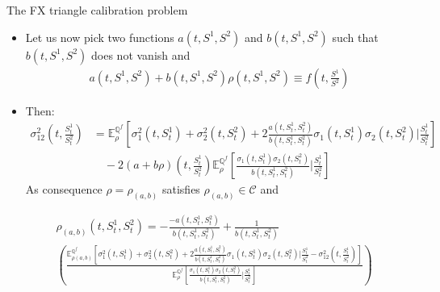 \documentclass[10pt]{beamer} %
\begin{document}
    \begin{frame}[t]{The FX triangle calibration problem}
    \begin{itemize}
    \item Let us now pick two functions $a(t,S^1,S^2)$ and $b(t,S^1,S^2)$ such that $b(t,S^1,S^2)$ does not vanish and
\begin{align*}\label{ABequation}
a(t,S^1,S^2) + b(t,S^1,S^2)\rho(t,S^1,S^2) \equiv f\left(t,\frac{S^1}{S^2}\right)
\end{align*}
	\item<+-> Then:
{\scriptsize
\begin{align*}
\sigma_{12}^2(t,\frac{S_t^1}{S_t^2}) 
&= \mathbb{E}_\rho^{\mathbb{Q}^f}\left[\sigma_1^2(t,S_t^1) + \sigma_2^2(t,S_t^2) + 2\frac{a(t,S_t^1,S_t^2)}{b(t,S_t^1,S_t^2)}\sigma_1 (t,S_t^1)\sigma_2(t,S_t^2)|\frac{S_t^1}{S_t^2}\right] 
\nonumber\\
&\quad - 2(a+b\rho)\left(t,\frac{S_t^1}{S_t^2}\right)\mathbb{E}_\rho^{\mathbb{Q}^f}\left[\frac{\sigma_1(t,S_t^1)\sigma_2(t,S_t^2)}{b(t,S_t^1,S_t^2)}|\frac{S_t^1}{S_t^2}\right]
\end{align*}
}
	 As consequence $\rho = \rho_{(a,b)}$ satisfies $\rho_{(a,b)} \in \mathcal{C}$ and
\end{itemize}
{\scriptsize
\begin{align*}
&\rho_{(a,b)}(t,S_t^1,S_t^2) = -\frac{ - a(t,S_t^1,S_t^2) }{b(t,S_t^1,S_t^2)} + \frac{1}{b(t,S_t^1,S_t^2)} \nonumber\\ & \left(
 \frac{\mathbb{E}_{\rho(a,b)}^{\mathbb{Q}^f}\left[\sigma_1^2(t,S_t^1) + \sigma_2^2(t,S_t^2) + 2\frac{a(t,S_t^1,S_t^2)}{b(t,S_t^1,S_t^2)}\sigma_1 (t,S_t^1)\sigma_2(t,S_t^2)|\frac{S_t^1}{S_t^2}-\sigma_{12}^2(t,\frac{S_t^1}{S_t^2})\right]}{\mathbb{E}_\rho^{\mathbb{Q}^f}[\frac{\sigma_1(t,S_t^1)\sigma_2(t,S_t^2)}{b(t,S_t^1,S_t^2)}|\frac{S_t^1}{S_t^2}]}\right)
\end{align*}
}
    
    \end{frame}
    
\end{document}
